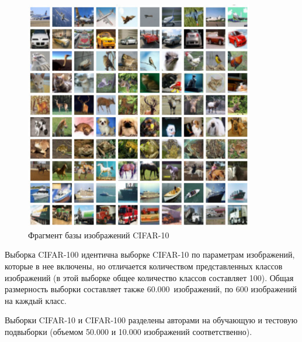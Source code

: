 \begin{figure}[h!]
	\begin{center}
		\includegraphics[width=10cm]{man-source/images/ch3/pic3-2.pdf}
		\caption{Фрагмент базы изображений CIFAR-10}				
		\label{fig:cifar_dataset}
	\end{center}
\end{figure}

Выборка CIFAR-100 идентична выборке CIFAR-10 по параметрам изображений, которые в нее включены, но отличается количеством представленных классов изображений (в этой выборке общее количество классов составляет 100). Общая размерность выборки составляет также 60.000~изображений, по 600 изображений на каждый класс.

Выборки CIFAR-10 и CIFAR-100 разделены авторами на обучающую и тестовую подвыборки (объемом 50.000 и 10.000 изображений соответственно).



